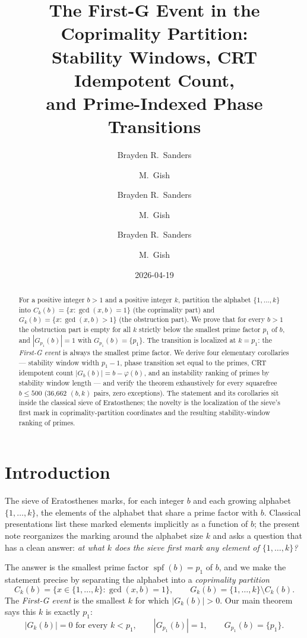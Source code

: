 \documentclass[11pt,reqno]{amsart}
\title[The First-G Event in the Coprimality Partition]
  {The First-G Event in the Coprimality Partition:\\
   Stability Windows, CRT Idempotent Count,\\
   and Prime-Indexed Phase Transitions}
\author{Brayden R.\ Sanders \and M.\ Gish}
\author{Brayden R.\ Sanders \and M.\ Gish}
\author{Brayden R.\ Sanders \and M.\ Gish}
\date{2026-04-19}
\theoremstyle{definition}
\DeclareMathOperator{\spf}{spf}
\begin{document}
\begin{abstract}
For a positive integer $b>1$ and a positive integer $k$, partition the alphabet
$\{1,\ldots,k\}$ into $C_k(b) = \{x : \gcd(x,b)=1\}$ (the coprimality part) and
$G_k(b) = \{x : \gcd(x,b)>1\}$ (the obstruction part). We prove that for every
$b>1$ the obstruction part is empty for all $k$ strictly below the smallest
prime factor $p_1$ of $b$, and $|G_{p_1}(b)| = 1$ with
$G_{p_1}(b) = \{p_1\}$. The transition is localized at $k = p_1$: the
\emph{First-G event} is always the smallest prime factor. We derive four
elementary corollaries --- stability window width $p_1 - 1$, phase transition
set equal to the primes, CRT idempotent count
$|G_b(b)| = b - \varphi(b)$, and an instability ranking of primes by stability
window length --- and verify the theorem exhaustively for every squarefree
$b \le 500$ (36{,}662 $(b,k)$ pairs, zero exceptions). The statement and its
corollaries sit inside the classical sieve of Eratosthenes; the novelty is
the localization of the sieve's first mark in coprimality-partition
coordinates and the resulting stability-window ranking of primes.
\end{abstract}

\maketitle

\section{Introduction}
\label{sec:intro}

The sieve of Eratosthenes marks, for each integer $b$ and each growing alphabet
$\{1,\ldots,k\}$, the elements of the alphabet that share a prime factor with
$b$. Classical presentations list these marked elements implicitly as a
function of $b$; the present note reorganizes the marking around the alphabet
size $k$ and asks a question that has a clean answer: \emph{at what $k$ does
the sieve first mark any element of $\{1,\ldots,k\}$?}

The answer is the smallest prime factor $\spf(b) = p_1$ of $b$, and we make
the statement precise by separating the alphabet into a \emph{coprimality
partition}
\[
  C_k(b) = \{x \in \{1,\ldots,k\} : \gcd(x,b) = 1\},
  \qquad
  G_k(b) = \{1,\ldots,k\} \setminus C_k(b).
\]
The \emph{First-G event} is the smallest $k$ for which $|G_k(b)| > 0$. Our
main theorem says this $k$ is exactly $p_1$:
\[
  |G_k(b)| = 0 \text{ for every } k < p_1,
  \qquad
  |G_{p_1}(b)| = 1,
  \qquad
  G_{p_1}(b) = \{p_1\}.
\]
\end{document}
